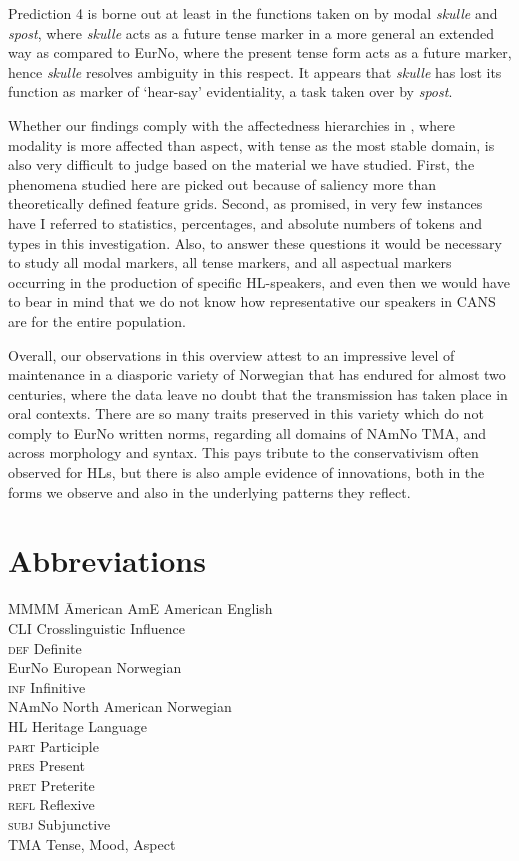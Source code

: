 \documentclass[output=paper]{langscibook}
\begin{document}
Prediction 4 is borne out at least in the functions taken on by modal \textit{skulle} and \textit{spost}, where \textit{skulle} acts as a future tense marker in a more general an extended way as compared to EurNo, where the present tense form acts as a future marker, hence \textit{skulle} resolves ambiguity in this respect. It appears that \textit{skulle} has lost its function as marker of ‘hear-say’ evidentiality, a task taken over by \textit{spost}. 

Whether our findings comply with the affectedness hierarchies in , where modality is more affected than aspect, with tense as the most stable domain, is also very difficult to judge based on the material we have studied. First, the phenomena studied here are picked out because of saliency more than theoretically defined feature grids. Second, as promised, in very few instances have I referred to statistics, percentages, and absolute numbers of tokens and types in this investigation. Also, to answer these questions it would be necessary to study all modal markers, all tense markers, and all aspectual markers occurring in the production of specific HL-speakers, and even then we would have to bear in mind that we do not know how representative our speakers in CANS are for the entire population.  

Overall, our observations in this overview attest to an impressive level of maintenance in a diasporic variety of Norwegian that has endured for almost two centuries, where the data leave no doubt that the transmission has taken place in oral contexts. There are so many traits preserved in this variety which do not comply to EurNo written norms, regarding all domains of NAmNo TMA, and across morphology and syntax. This pays tribute to the conservativism often observed for HLs, but there is also ample evidence of innovations, both in the forms we observe and also in the underlying patterns they reflect. 

\section*{Abbreviations}
\begin{multicols}{2}
\begin{tabbing}
MMMM \= American\kill
AmE   \>  American English\\
CLI   \>  Crosslinguistic Influence\\
\textsc{def}   \>  Definite\\
EurNo \>  European Norwegian\\
\textsc{inf}   \>  Infinitive\\
NAmNo \>  North American Norwegian\\
HL    \>  Heritage Language\\
\textsc{part}  \>  Participle\\
\textsc{pres}  \>  Present\\
\textsc{pret}  \>  Preterite\\
\textsc{refl} \> Reflexive\\
\textsc{subj}  \>  Subjunctive\\
TMA   \>  Tense, Mood, Aspect
\end{tabbing}
\end{multicols}
\end{document}
